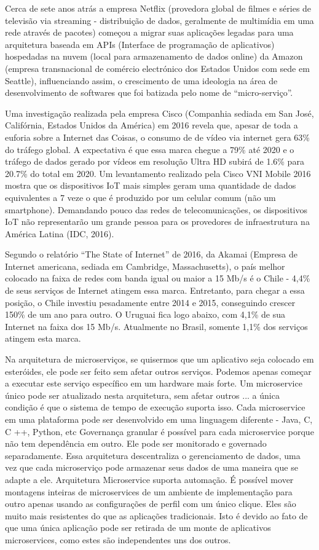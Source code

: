 \documentclass[journal]{IEEEtran}
\begin{document}
Cerca de sete anos atrás a empresa Netflix (provedora global de filmes e séries de televisão via streaming - distribuição de dados, geralmente de multimídia em uma rede através de pacotes) começou a migrar suas aplicações legadas para uma arquitetura baseada em APIs (Interface de programação de aplicativos) hospedadas na nuvem (local para armazenamento de dados online) da Amazon (empresa transnacional de comércio electrónico dos Estados Unidos com sede em Seattle), influenciando assim, o crescimento de uma ideologia na área de desenvolvimento de softwares que foi batizada pelo nome de “micro-serviço”.

Uma investigação realizada pela empresa Cisco (Companhia sediada em San José, Califórnia, Estados Unidos da América) em 2016 revela que, apesar de toda a euforia sobre a Internet das Coisas, o consumo de de vídeo via internet gera 63\% do tráfego global. A expectativa é que essa marca chegue a 79\% até 2020 e o tráfego de dados gerado por vídeos em resolução Ultra HD subirá de 1.6\% para 20.7\% do total em 2020. Um levantamento realizado pela Cisco VNI Mobile 2016 mostra que os dispositivos IoT mais simples geram uma quantidade de dados equivalentes a 7 veze o que é produzido por um celular comum (não um smartphone). Demandando pouco das redes de telecomunicações, os dispositivos IoT não representarão um grande pessoa para os provedores de infraestrutura na América Latina (IDC, 2016). 

Segundo o relatório “The State of Internet” de 2016, da Akamai (Empresa de Internet americana, sediada em Cambridge, Massachusetts), o país melhor colocado na faixa de redes com banda igual ou maior a 15 Mb/s é o Chile - 4,4\% de seus serviços de Internet atingem essa marca. Entretanto, para chegar a essa posição, o Chile investiu pesadamente entre 2014 e 2015, conseguindo crescer 150\% de um ano para outro. O Uruguai fica logo abaixo, com 4,1\% de sua Internet na faixa dos 15 Mb/s. Atualmente no Brasil, somente 1,1\% dos serviços atingem esta marca.

Na arquitetura de microserviços, se quisermos que um aplicativo seja colocado em esteróides, ele pode ser feito sem afetar outros serviços. Podemos apenas começar a executar este serviço específico em um hardware mais forte. Um microservice único pode ser atualizado nesta arquitetura, sem afetar outros ... a única condição é que o sistema de tempo de execução suporta isso. Cada microservice em uma plataforma pode ser desenvolvido em uma linguagem diferente - Java, C, C ++, Python, etc Governança granular é possível para cada microservice porque não tem dependência em outro. Ele pode ser monitorado e governado separadamente. Essa arquitetura descentraliza o gerenciamento de dados, uma vez que cada microserviço pode armazenar seus dados de uma maneira que se adapte a ele. Arquitetura Microservice suporta automação. É possível mover montagens inteiras de microservices de um ambiente de implementação para outro apenas usando as configurações de perfil com um único clique. Eles são muito mais resistentes do que as aplicações tradicionais. Isto é devido ao fato de que uma única aplicação pode ser retirada de um monte de aplicativos microservices, como estes são independentes uns dos outros.
\end{document}
